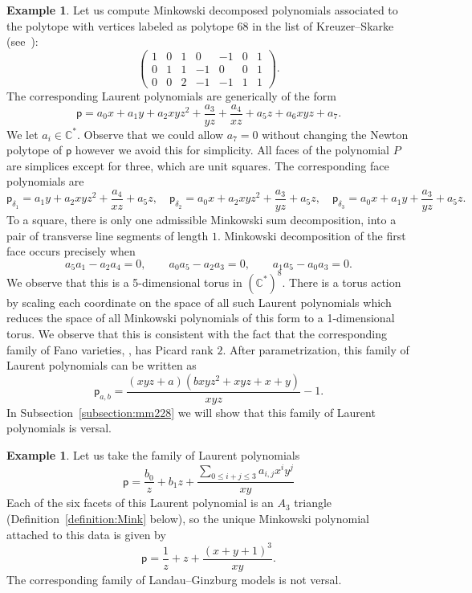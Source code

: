 \documentclass[10pt]{amsart}
\numberwithin{equation}{section}
\theoremstyle{plain}
\theoremstyle{definition}
\newtheorem{example}[theorem]{Example}
\theoremstyle{remark}
\begin{document}
\begin{example}\label{example:2.28}
  Let us compute Minkowski decomposed polynomials associated to the polytope with vertices labeled as polytope 68 in the list of Kreuzer--Skarke (see~\cite{kreuzer2004PALP}):
  \[
    \left(
      \begin{array}{rrrrrrr}
        1 & 0 &1 &0 &-1& 0& 1 \\
        0 & 1 & 1 & -1&  0& 0& 1 \\
        0 & 0 & 2 & -1& -1 &1 & 1
      \end{array}
    \right).
  \]
  The corresponding Laurent polynomials are generically of the form
  \[
    \mathsf{p} = a_0x + a_1 y+ a_2xyz^2 + \dfrac{a_3}{yz} + \dfrac{a_4}{xz} + a_5z + a_6xyz + a_7.
  \]
  We let \(a_i \in \mathbb{C}^*\). Observe that we could allow \(a_7 = 0\) without changing the Newton polytope of \(\mathsf{p}\) however we avoid this for simplicity. All faces of the polynomial \(P\) are simplices except for three, which are unit squares. The corresponding face polynomials are
  \[
    \mathsf{p}_{\delta_1} = a_1y + a_2xyz^2 + \dfrac{a_4}{xz} + a_5z,\quad \mathsf{p}_{\delta_2} = a_0x + a_2xyz^2 +\dfrac{a_3}{yz} + a_5z, \quad \mathsf{p}_{\delta_3} = a_0x + a_1y + \dfrac{a_3}{yz} + a_5z.
  \]
  To a square, there is only one admissible Minkowski sum decomposition, into a pair of transverse line segments of length \(1\). Minkowski decomposition of the first face occurs precisely when
  \[
    a_5a_1 - a_2a_4 = 0,\qquad a_0a_5 - a_2a_3=0,\qquad a_1a_5 - a_0a_3 = 0.
  \]
  We observe that this is a 5-dimensional torus in \((\mathbb{C}^*)^8\). There is a torus action by scaling each coordinate on the space of all such Laurent polynomials which reduces the space of all Minkowski polynomials of this form to a 1-dimensional torus. We observe that this is consistent with the fact that the corresponding family of Fano varieties, , has Picard rank \(2\). After parametrization, this family of Laurent polynomials can be written as
  \[
    \mathsf{p}_{a,b} = \dfrac{(xyz + a) (bxyz^2 + xyz + x + y)}{xyz} - 1.
  \]
  In Subsection~\ref{subsection:mm228} we will show that this family of Laurent polynomials is versal.
\end{example}

\begin{example}
  Let us take the family of Laurent polynomials
  \begin{equation}\label{equation:dp6}
    \mathsf{p} =  \dfrac{b_0}{z} + b_1z  + \dfrac{ \sum_{0 \leq i+j\leq 3} a_{i,j} x^i y^j}{xy}
  \end{equation}
  Each of the six facets of this Laurent polynomial is an \(A_3\) triangle (Definition~\ref{definition:Mink} below), so the unique Minkowski polynomial attached to this data is given by
  \[
    \mathsf{p} = \dfrac{1}{z} + z + \dfrac{(x+y + 1)^3}{xy}.
  \]
  The corresponding family of Landau--Ginzburg models is {not} versal.
\end{example}
\end{document}
